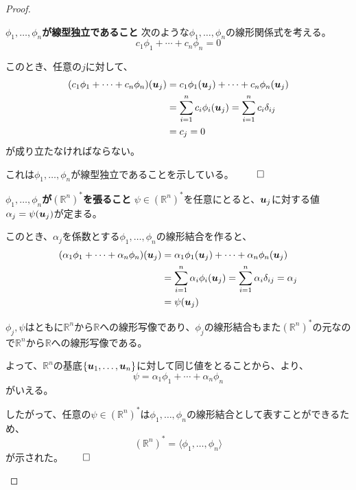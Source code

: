 \documentclass[../../../topic_linear-algebra]{subfiles}
\begin{document}
\begin{proof}
  \begin{subpattern}{\bfseries $\phi_1, \ldots, \phi_n$が線型独立であること}
    次のような$\phi_1, \ldots, \phi_n$の線形関係式を考える。
    \begin{equation*}
      c_1 \phi_1 + \cdots + c_n \phi_n = 0
    \end{equation*}
    
    このとき、任意の$j$に対して、
    \begin{align*}
      (c_1 \phi_1 + \cdots + c_n \phi_n)(\vb*{u}_j) &= c_1 \phi_1(\vb*{u}_j) + \cdots + c_n \phi_n(\vb*{u}_j) \\
      &= \sum_{i=1}^n c_i \phi_i(\vb*{u}_j) = \sum_{i=1}^n c_i \delta_{ij} \\
      &= c_j = 0
    \end{align*}
    が成り立たなければならない。
    
    これは$\phi_1, \ldots, \phi_n$が線型独立であることを示している。 $\qed$
  \end{subpattern}
  
  \begin{subpattern}{\bfseries $\phi_1, \ldots, \phi_n$が$(\mathbb{R}^n)^*$を張ること}
    $\psi \in (\mathbb{R}^n)^*$を任意にとると、$\vb*{u}_j$に対する値$\alpha_j = \psi(\vb*{u}_j)$が定まる。
    
    \br
    
    このとき、$\alpha_j$を係数とする$\phi_1, \ldots, \phi_n$の線形結合を作ると、
    \begin{align*}
      (\alpha_1 \phi_1 + \cdots + \alpha_n \phi_n)(\vb*{u}_j) &= \alpha_1 \phi_1(\vb*{u}_j) + \cdots + \alpha_n \phi_n(\vb*{u}_j) \\
      &= \sum_{i=1}^n \alpha_i \phi_i(\vb*{u}_j) = \sum_{i=1}^n \alpha_i \delta_{ij} = \alpha_j \\
      &= \psi(\vb*{u}_j)
    \end{align*}
    
    $\phi_j,\psi$はともに$\mathbb{R}^n$から$\mathbb{R}$への線形写像であり、$\phi_j$の線形結合もまた$(\mathbb{R}^n)^*$の元なので$\mathbb{R}^n$から$\mathbb{R}$への線形写像である。

    よって、$\mathbb{R}^n$の基底$\{\vb*{u}_1, \ldots, \vb*{u}_n\}$に対して同じ値をとることから、より、
    \begin{equation*}
      \psi = \alpha_1 \phi_1 + \cdots + \alpha_n \phi_n
    \end{equation*}
    がいえる。
    
    \br
    
    したがって、任意の$\psi \in (\mathbb{R}^n)^*$は$\phi_1, \ldots, \phi_n$の線形結合として表すことができるため、
    \begin{equation*}
      (\mathbb{R}^n)^* = \langle \phi_1, \ldots, \phi_n \rangle
    \end{equation*}
    が示された。$\qed$
  \end{subpattern}
\end{proof}
\end{document}
